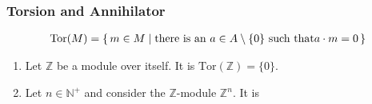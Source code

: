 %
%




\subsubsection*{Torsion and Annihilator}
\begin{defbox}
    \begin{definition}
        \begin{align*}
            \mathrm{Tor}(M) = \left\{\, m \in M \mid \text{there is an } a \in A \setminus \{ 0 \} \text{ such that} a \cdot m = 0 \,\right\}
        \end{align*}
    \end{definition}
\end{defbox}

\begin{example}
    \begin{enumerate}
        \item Let \(\mathbb{Z}\) be a module over itself. It is \(\mathrm{Tor}(\mathbb{Z}) = \{0\}\).
        \item Let \(n \in \mathbb{N}^+\) and consider the \(\mathbb{Z}\)-module \(\mathbb{Z}^n\). It is
    \end{enumerate}
\end{example}

